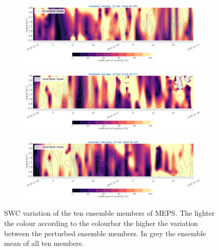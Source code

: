\begin{figure}[t]\ContinuedFloat
	\centering
	\begin{subfigure}[t]{\textwidth}		\includegraphics[trim={0.cm 5.3cm 0cm 0cm},clip,width=\textwidth]{./fig_variation/20161225}
		\caption{}\label{fig:ens_vari25}
	\end{subfigure}
	\begin{subfigure}[t]{\textwidth}		\includegraphics[trim={0.cm 5.3cm 0cm 0cm},clip,width=\textwidth]{./fig_variation/20161226}
		\caption{}\label{fig:ens_vari26}
	\end{subfigure}
	
	\begin{subfigure}[t]{\textwidth}		\includegraphics[trim={15.cm 0cm 15cm 21cm},clip,width=\textwidth]{./fig_variation/20161224}
	\end{subfigure}
	\caption{SWC variation of the ten ensemble members of MEPS. The lighter the colour according to the colourbar the higher the variation between the perturbed ensemble members. In grey the ensemble mean of all ten members.}\label{fig:ens_vari}
\end{figure}

